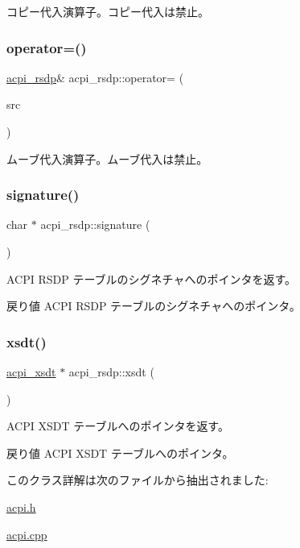 コピー代入演算子。コピー代入は禁止。 \hypertarget{classacpi__rsdp_a8ced51610f5b4769fc89e222a866bf5a}{}\label{classacpi__rsdp_a8ced51610f5b4769fc89e222a866bf5a} 
\subsubsection{\texorpdfstring{operator=()}{operator=()}\hspace{0.1cm}{\footnotesize\ttfamily [2/2]}}
{\footnotesize\ttfamily \hyperlink{classacpi__rsdp}{acpi\+\_\+rsdp}\& acpi\+\_\+rsdp\+::operator= (\begin{DoxyParamCaption}\item[{const \hyperlink{classacpi__rsdp}{acpi\+\_\+rsdp} \&\&}]{src }\end{DoxyParamCaption})\hspace{0.3cm}{\ttfamily [delete]}}

ムーブ代入演算子。ムーブ代入は禁止。 \hypertarget{classacpi__rsdp_a00665758ce838d3834c63fd0464e170f}{}\label{classacpi__rsdp_a00665758ce838d3834c63fd0464e170f} 
\subsubsection{\texorpdfstring{signature()}{signature()}}
{\footnotesize\ttfamily char $\ast$ acpi\+\_\+rsdp\+::signature (\begin{DoxyParamCaption}{ }\end{DoxyParamCaption})}

A\+C\+PI R\+S\+DP テーブルのシグネチャへのポインタを返す。 \begin{DoxyReturn}{戻り値}
A\+C\+PI R\+S\+DP テーブルのシグネチャへのポインタ。 
\end{DoxyReturn}
\hypertarget{classacpi__rsdp_a466b4f6a7be1d7d6c20376bade914d2f}{}\label{classacpi__rsdp_a466b4f6a7be1d7d6c20376bade914d2f} 
\subsubsection{\texorpdfstring{xsdt()}{xsdt()}}
{\footnotesize\ttfamily \hyperlink{classacpi__xsdt}{acpi\+\_\+xsdt} $\ast$ acpi\+\_\+rsdp\+::xsdt (\begin{DoxyParamCaption}{ }\end{DoxyParamCaption})}

A\+C\+PI X\+S\+DT テーブルへのポインタを返す。 \begin{DoxyReturn}{戻り値}
A\+C\+PI X\+S\+DT テーブルへのポインタ。 
\end{DoxyReturn}


このクラス詳解は次のファイルから抽出されました\+:\begin{DoxyCompactItemize}
\item 
\hyperlink{acpi_8h}{acpi.\+h}\item 
\hyperlink{acpi_8cpp}{acpi.\+cpp}\end{DoxyCompactItemize}
